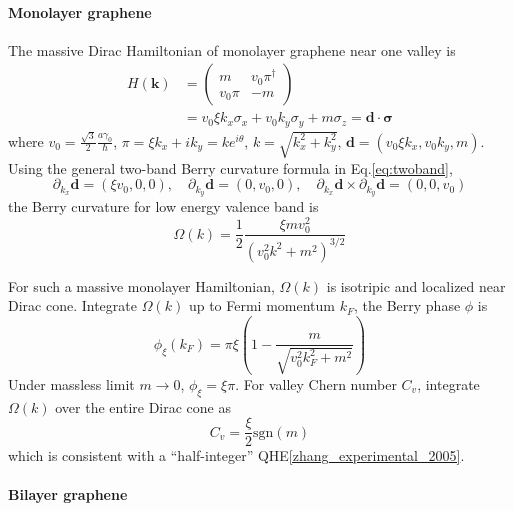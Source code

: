 \documentclass[12pt,a4paper]{article}
\begin{document}
\paragraph{Monolayer graphene}

    The massive Dirac Hamiltonian of monolayer graphene near one valley is
    \begin{equation}
    \begin{aligned}
        H(\mathbf k)
        & = \begin{pmatrix}
            m & v_0 \pi^\dagger \\
            v_0 \pi & -m
        \end{pmatrix} \\
        & = v_0 \xi k_x \sigma_x + v_0 k_y \sigma_y + m \sigma_z
        = \mathbf{d} \cdot \bm{\sigma}
    \end{aligned}
    \end{equation}
    where $v_0 = \frac{\sqrt{3}}{2} \frac{a\gamma_0}{\hbar}$, $\pi = \xi k_x + i k_y = k e^{i\theta}$, $k = \sqrt{k_x^2 + k_y^2}$, $\mathbf{d} = (v_0 \xi k_x, v_0 k_y, m)$.
    Using the general two-band Berry curvature formula in Eq.\eqref{eq:twoband},
    \[
        \partial_{k_x}\mathbf{d} = \left(\xi v_0, 0, 0\right), \quad
        \partial_{k_y}\mathbf{d} = \left(0, v_0, 0\right), \quad
        \partial_{k_x}\mathbf{d} \times \partial_{k_y}\mathbf{d} = \left(0, 0, v_0\right)
    \]
    the Berry curvature for low energy valence band is
    \begin{equation}
    \label{eq:Omega_M}
        \Omega(k) = \frac{1}{2} \frac{\xi m v_0^2}{\left(v_0^2 k^2 + m^2\right)^{3/2}}
    \end{equation}

    For such a massive monolayer Hamiltonian, $\Omega(k)$ is isotripic and localized near Dirac cone. Integrate $\Omega(k)$ up to Fermi momentum $k_F$, the Berry phase $\phi$ is
    \[
        \phi_{\xi}(k_F) = \pi \xi \left(1 - \frac{m}{\sqrt{v_0^2k_F^2 + m^2}}\right)
    \]
    Under massless limit $m\to 0$, $\phi_{\xi} = \xi\pi$. For valley Chern number $C_v$, integrate $\Omega(k)$ over the entire Dirac cone as
    \begin{equation}
    \label{eq:Cv_M}
        C_v = \frac{\xi}{2} \mathrm{sgn}(m)
    \end{equation}
    which is consistent with a ``half-integer'' QHE\ref{zhang_experimental_2005}.

\paragraph{Bilayer graphene}
\end{document}
